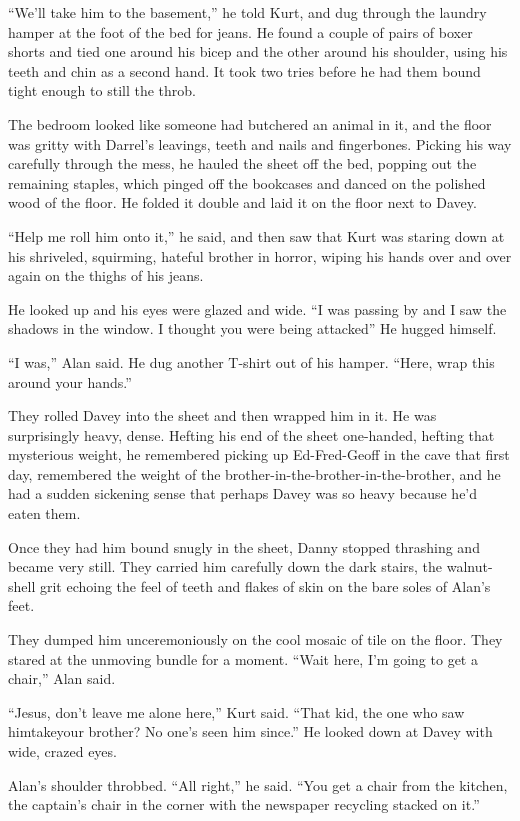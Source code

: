 ``We'll take him to the basement,'' he told Kurt, and dug through the
laundry hamper at the foot of the bed for jeans.  He found a couple of
pairs of boxer shorts and tied one around his bicep and the other
around his shoulder, using his teeth and chin as a second hand.  It
took two tries before he had them bound tight enough to still the
throb.

The bedroom looked like someone had butchered an animal in it, and the
floor was gritty with Darrel's leavings, teeth and nails and
fingerbones.  Picking his way carefully through the mess, he hauled
the sheet off the bed, popping out the remaining staples, which pinged
off the bookcases and danced on the polished wood of the floor.  He
folded it double and laid it on the floor next to Davey.

``Help me roll him onto it,'' he said, and then saw that Kurt was
staring down at his shriveled, squirming, hateful brother in horror,
wiping his hands over and over again on the thighs of his jeans.

He looked up and his eyes were glazed and wide.  ``I was passing by
and I saw the shadows in the window.  I thought you were being
attacked\dash{}'' He hugged himself.

``I was,'' Alan said.  He dug another T-shirt out of his hamper. 
``Here, wrap this around your hands.''

They rolled Davey into the sheet and then wrapped him in it.  He was
surprisingly heavy, dense.  Hefting his end of the sheet one-handed,
hefting that mysterious weight, he remembered picking up Ed-Fred-Geoff
in the cave that first day, remembered the weight of the
brother-in-the-brother-in-the-brother, and he had a sudden sickening
sense that perhaps Davey was so heavy because he'd eaten them.

Once they had him bound snugly in the sheet, Danny stopped thrashing
and became very still.  They carried him carefully down the dark
stairs, the walnut-shell grit echoing the feel of teeth and flakes of
skin on the bare soles of Alan's feet.

They dumped him unceremoniously on the cool mosaic of tile on the
floor.  They stared at the unmoving bundle for a moment.  ``Wait here,
I'm going to get a chair,'' Alan said.

``Jesus, don't leave me alone here,'' Kurt said.  ``That kid, the one
who saw him\dash{}take\dash{}your brother?  No one's seen him since.'' He
looked down at Davey with wide, crazed eyes.

Alan's shoulder throbbed.  ``All right,'' he said.  ``You get a chair
from the kitchen, the captain's chair in the corner with the newspaper
recycling stacked on it.''

